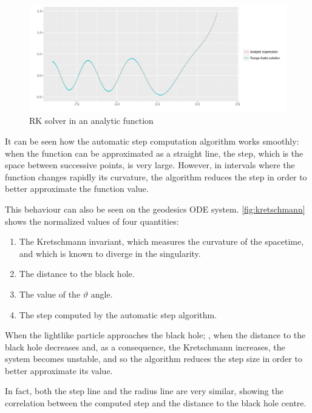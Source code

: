 \begin{figure}[bth]
	\myfloatalign
	\includegraphics[width=1.3\linewidth]{gfx/analytic}
	\caption[Solver in an analytic function]{\ac{RK} solver in an analytic function}
	\label{fig:stepsize}
\end{figure}

It can be seen how the automatic step computation algorithm works smoothly: when the function can be approximated as a straight line, the step, which is the space between successive points, is very large. However, in intervals where the function changes rapidly its curvature, the algorithm reduces the step in order to better approximate the function value.

This behaviour can also be seen on the geodesics \ac{ODE} system. \autoref{fig:kretschmann} shows the normalized values of four quantities:
\begin{enumerate}
	\item The Kretschmann invariant, which measures the curvature of the spacetime, and which is known to diverge in the singularity.
	\item The distance to the black hole.
	\item The value of the $\vartheta$ angle.
	\item The step computed by the automatic step algorithm.
\end{enumerate}

When the lightlike particle approaches the black hole; \ie, when the distance to the black hole decreases and, as a consequence, the Kretschmann increases, the system becomes unstable, and so the algorithm reduces the step size in order to better approximate its value.

In fact, both the step line and the radius line are very similar, showing the correlation between the computed step and the distance to the black hole centre.

